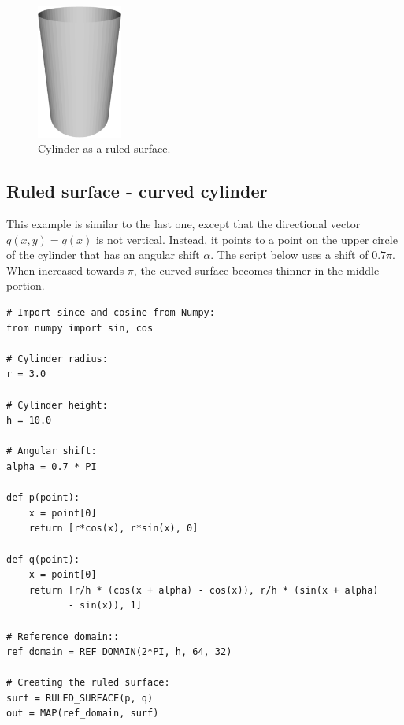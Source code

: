 \begin{figure}[!ht]
\begin{center}
\includegraphics[width=0.25\textwidth]{img/curves-8.png}
\end{center}
\vspace{-4mm}
\caption{Cylinder as a ruled surface.}
\label{fig:curves-8}
\end{figure}

\subsection{Ruled surface - curved cylinder}

This example is similar to the last one, except that the directional
vector $q(x, y) = q(x)$ is not vertical. Instead, it points 
to a point on the upper circle of the cylinder that has an 
angular shift $\alpha$. The script below uses a shift of $0.7\pi$. 
When increased towards $\pi$, the curved surface becomes thinner 
in the middle portion. \\

\begin{bbox}
\begin{verbatim}
# Import since and cosine from Numpy:
from numpy import sin, cos

# Cylinder radius:
r = 3.0

# Cylinder height:
h = 10.0

# Angular shift:
alpha = 0.7 * PI

def p(point):
    x = point[0]
    return [r*cos(x), r*sin(x), 0]
  
def q(point):
    x = point[0]
    return [r/h * (cos(x + alpha) - cos(x)), r/h * (sin(x + alpha) 
           - sin(x)), 1]

# Reference domain::  
ref_domain = REF_DOMAIN(2*PI, h, 64, 32)

# Creating the ruled surface:
surf = RULED_SURFACE(p, q)
out = MAP(ref_domain, surf)
\end{verbatim}
\end{bbox}
\vspace{6mm}

